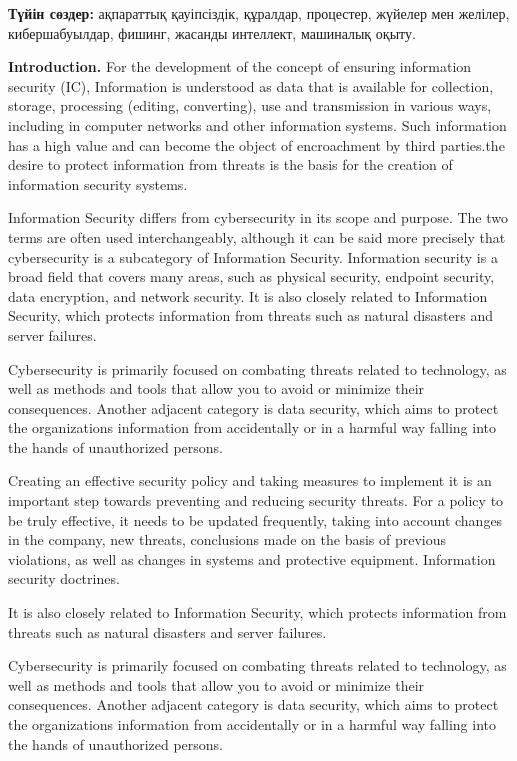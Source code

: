 {\bfseries Түйін сөздер:} ақпараттық қауіпсіздік, құралдар, процестер,
жүйелер мен желілер, кибершабуылдар, фишинг, жасанды интеллект,
машиналық оқыту.

{\bfseries Introduction.} For the development of the concept of ensuring
information security (IC), Information is understood as data that is
available for collection, storage, processing (editing, converting), use
and transmission in various ways, including in computer networks and
other information systems. Such information has a high value and can
become the object of encroachment by third parties.the desire to protect
information from threats is the basis for the creation of information
security systems.

Information Security differs from cybersecurity in its scope and
purpose. The two terms are often used interchangeably, although it can
be said more precisely that cybersecurity is a subcategory of
Information Security. Information security is a broad field that covers
many areas, such as physical security, endpoint security, data
encryption, and network security. It is also closely related to
Information Security, which protects information from threats such as
natural disasters and server failures.

Cybersecurity is primarily focused on combating threats related to
technology, as well as methods and tools that allow you to avoid or
minimize their consequences. Another adjacent category is data security,
which aims to protect the organization\textquotesingle s information
from accidentally or in a harmful way falling into the hands of
unauthorized persons.

Creating an effective security policy and taking measures to implement
it is an important step towards preventing and reducing security
threats. For a policy to be truly effective, it needs to be updated
frequently, taking into account changes in the company, new threats,
conclusions made on the basis of previous violations, as well as changes
in systems and protective equipment. Information security doctrines.

It is also closely related to Information Security, which protects
information from threats such as natural disasters and server failures.

Cybersecurity is primarily focused on combating threats related to
technology, as well as methods and tools that allow you to avoid or
minimize their consequences. Another adjacent category is data security,
which aims to protect the organization\textquotesingle s information
from accidentally or in a harmful way falling into the hands of
unauthorized persons.

